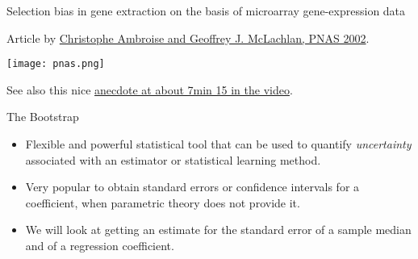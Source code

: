 \documentclass[10pt,ignorenonframetext,]{beamer}
\providecommand{\tightlist}{%
  \setlength{\itemsep}{0pt}\setlength{\parskip}{0pt}}
\begin{document}
\begin{frame}

\begin{block}{Selection bias in gene extraction on the basis of
microarray gene-expression data}

\vspace{2mm}

Article by \href{http://www.pnas.org/content/99/10/6562}{Christophe
Ambroise and Geoffrey J. McLachlan, PNAS 2002}.

\texttt{[image: pnas.png]}

\vspace{10mm}

See also this nice
\href{https://www.youtube.com/watch?v=S06JpVoNaA0}{anecdote at about
7min 15 in the video}.

\end{block}

\end{frame}

\begin{frame}{The Bootstrap}
\protect\hypertarget{the-bootstrap}{}

\vspace{2mm}

\begin{itemize}
\tightlist
\item
  Flexible and powerful statistical tool that can be used to quantify
  \emph{uncertainty} associated with an estimator or statistical
  learning method.
\end{itemize}

\vspace{2mm}

\begin{itemize}
\tightlist
\item
  Very popular to obtain standard errors or confidence intervals for a
  coefficient, when parametric theory does not provide it.
\end{itemize}

\vspace{2mm}

\begin{itemize}
\tightlist
\item
  We will look at getting an estimate for the standard error of a sample
  median and of a regression coefficient.
\end{itemize}

\end{frame}
\end{document}
